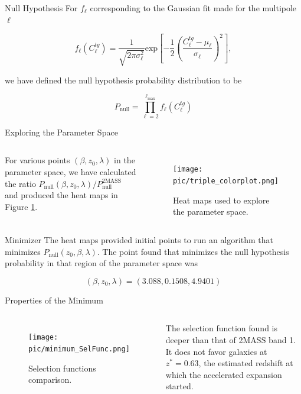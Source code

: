 \documentclass[serif, aspectratio=169]{beamer}
\begin{document}
\begin{frame}{Null Hypothesis}
    For $f_\ell$ corresponding to the Gaussian fit made for the multipole $\ell$

    \begin{equation}
        f_\ell(C_\ell^{tg})=\frac{1}{\sqrt{2\pi \sigma_\ell^2}}\text{exp}\left[-\frac{1}{2}\left(\frac{C_\ell^{tg}-\mu_\ell}{\sigma_\ell}\right)^2\right],
    \end{equation}

    we have defined the null hypothesis probability distribution to be

    \begin{equation}
        P_\text{null}=\prod_{\ell=2}^{\ell_\text{max}} f_\ell(C_\ell^{tg})
    \end{equation}
\end{frame}

\begin{frame}{Exploring the Parameter Space}
    \begin{columns}
        For various points $(\beta, z_0, \lambda)$ in the parameter space, we have calculated the ratio $P_\text{null}(\beta, z_0, \lambda)/P_\text{null}^\text{2MASS}$ and produced the heat maps in Figure \ref{fig:HeatMaps}. 

    \begin{figure}
        \centering
        \texttt{[image: pic/triple\_colorplot.png]}
        \caption{Heat maps used to explore the parameter space.}
        \label{fig:HeatMaps}
    \end{figure}
    \end{columns}
\end{frame}

\begin{frame}{Minimizer}
    The heat maps provided initial points to run an algorithm that minimizes $P_\text{null}(z_0,\beta, \lambda)$. The point found that minimizes the null hypothesis probability in that region of the parameter space was

    \begin{equation}
        (\beta, z_0, \lambda)=(3.088, 0.1508, 4.9401)
    \end{equation}
\end{frame}

\begin{frame}{Properties of the Minimum}
\begin{columns}
    \begin{figure}
        \centering
        \texttt{[image: pic/minimum\_SelFunc.png]}
        \caption{Selection functions comparison.}
        \label{fig:minimum_SelFunc}
    \end{figure}
    The selection function found is deeper than that of 2MASS band 1. It does not favor galaxies at $z^*=0.63$, the estimated redshift at which the accelerated expansion started.
\end{columns}
\end{frame}
\end{document}
